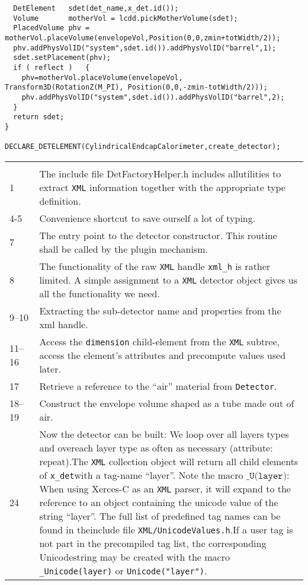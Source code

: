 \begin{verbatim}
  DetElement   sdet(det_name,x_det.id());
  Volume       motherVol = lcdd.pickMotherVolume(sdet);
  PlacedVolume phv = motherVol.placeVolume(envelopeVol,Position(0,0,zmin+totWidth/2));
  phv.addPhysVolID("system",sdet.id()).addPhysVolID("barrel",1);
  sdet.setPlacement(phv);
  if ( reflect )   {
    phv=motherVol.placeVolume(envelopeVol, Transform3D(RotationZ(M_PI), Position(0,0,-zmin-totWidth/2)));
    phv.addPhysVolID("system",sdet.id()).addPhysVolID("barrel",2);
  }
  return sdet;
}

DECLARE_DETELEMENT(CylindricalEndcapCalorimeter,create_detector);
\end{verbatim}
{\small
\begin{tabular} {p{0.1\linewidth}|p{0.9\linewidth}}
\hline \\
1 & The include file DetFactoryHelper.h includes allutilities to extract \texttt{XML} information together with the appropriate type definition.\\
4-5 & Convenience shortcut to save ourself a lot of typing.\\
7 & The entry point to the detector constructor. This routine shall be called by the plugin mechanism.\\
8 & The functionality of the raw \texttt{XML} handle \texttt{xml\_h} is rather limited. A simple assignment to a \texttt{XML} detector object gives us all the functionality we need.\\
9--10 & Extracting the sub-detector name and properties from the xml handle.\\
11--16 & Access the \texttt{dimension} child-element from the \texttt{XML} subtree, access the element's attributes and precompute values used later.\\
17 & Retrieve a reference to the ``air'' material from \texttt{Detector}.\\
18--19 & Construct the envelope volume shaped as a tube made out of air.\\
24 & Now the detector can be built: We loop over all layers types and overeach layer type as often as necessary (attribute: repeat).The \texttt{XML} collection object will return all child elements of \texttt{x\_det}with a tag-name ``layer''.  Note the macro $\texttt{\_U(layer)}$: When using Xerces-C as an \texttt{XML} parser, it will expand to the reference to an object containing the unicode value of the string ``layer''. The full list of predefined tag names can be found in theinclude file \texttt{XML/UnicodeValues.h}.If a user tag is not part in the precompiled tag list, the corresponding Unicodestring may be created with the macro \texttt{\_Unicode(layer)} or \texttt{Unicode("layer")}.\\

\end{tabular}}
